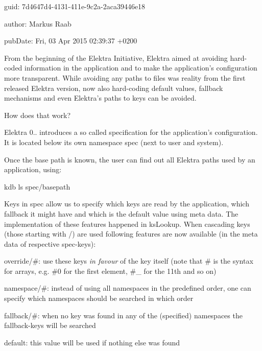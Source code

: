 \begin{DoxyItemize}
\item guid\+: 7d4647d4-\/4131-\/411e-\/9c2a-\/2aca39446e18
\item author\+: Markus Raab
\item pub\+Date\+: Fri, 03 Apr 2015 02\+:39\+:37 +0200
\end{DoxyItemize}

From the beginning of the Elektra Initiative, Elektra aimed at avoiding hard-\/coded information in the application and to make the application's configuration more transparent. While avoiding any paths to files was reality from the first released Elektra version, now also hard-\/coding default values, fallback mechanisms and even Elektra's paths to keys can be avoided.

How does that work?

Elektra 0.. introduces a so called specification for the application's configuration. It is located below its own namespace {\ttfamily spec} (next to user and system).

Once the base path is known, the user can find out all Elektra paths used by an application, using\+: \begin{DoxyVerb}kdb ls spec/basepath
\end{DoxyVerb}


Keys in {\ttfamily spec} allow us to specify which keys are read by the application, which fallback it might have and which is the default value using meta data. The implementation of these features happened in {\ttfamily ks\+Lookup}. When cascading keys (those starting with {\ttfamily /}) are used following features are now available (in the meta data of respective {\ttfamily spec}-\/keys)\+:


\begin{DoxyItemize}
\item {\ttfamily override/\#}\+: use these keys {\itshape in favour} of the key itself (note that {\ttfamily \#} is the syntax for arrays, e.\+g. {\ttfamily \#0} for the first element, {\ttfamily \#\+\_} for the 11th and so on)
\item {\ttfamily namespace/\#}\+: instead of using all namespaces in the predefined order, one can specify which namespaces should be searched in which order
\item {\ttfamily fallback/\#}\+: when no key was found in any of the (specified) namespaces the {\ttfamily fallback}-\/keys will be searched
\item {\ttfamily default}\+: this value will be used if nothing else was found
\end{DoxyItemize}

